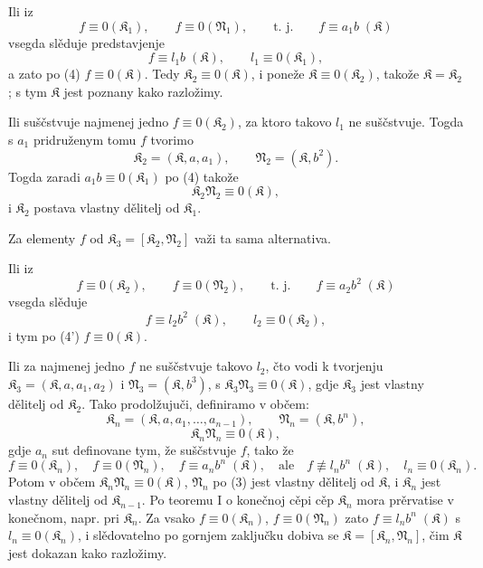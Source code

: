 \documentclass[11pt]{article}
\newcommand{\ideal}[1]{\mathfrak{#1}}
\begin{document}
Ili iz
\[
 f\equiv0(\ideal K_1),\qquad f\equiv0(\ideal N_1),
 \qquad\text{t. j.}\qquad f\equiv a_1 b\;(\ideal K)
\]
vsegda slěduje predstavjenje
\[
 f\equiv l_1 b\;(\ideal K),\qquad l_1\equiv0(\ideal K_1),
\]
a zato po (4) \(f\equiv0(\ideal K)\). Tedy \(\ideal K_2\equiv0(\ideal K)\), i poneže \(\ideal K\equiv0(\ideal K_2)\), takože \(\ideal K=\ideal K_2\); s tym \(\ideal K\) jest poznany kako razložimy.

Ili suščstvuje najmenej jedno \(f\equiv0(\ideal K_2)\), za ktoro takovo \(l_1\) ne suščstvuje. Togda s \(a_1\) pridruženym tomu \(f\) tvorimo
\[
 \ideal K_2=(\ideal K,a,a_1),\qquad \ideal N_2=(\ideal K,b^2).
\]
Togda zaradi \(a_1b\equiv0(\ideal K_1)\) po (4) takože
\begin{equation}
 \ideal K_2\ideal N_2\equiv0(\ideal K),
\tag{4'}
\end{equation}
i \(\ideal K_2\) postava vlastny dělitelj od \(\ideal K_1\).

Za elementy \(f\) od \(\ideal K_3=[\ideal K_2,\ideal N_2]\) važi ta sama alternativa.

Ili iz
\[
 f\equiv0(\ideal K_2),\qquad f\equiv0(\ideal N_2),
 \qquad\text{t. j.}\qquad f\equiv a_2b^2\;(\ideal K)
\]
vsegda slěduje
\[
 f\equiv l_2b^2\;(\ideal K),\qquad l_2\equiv0(\ideal K_2),
\]
i tym po (4') \(f\equiv0(\ideal K)\).

Ili za najmenej jedno \(f\) ne suščstvuje takovo \(l_2\), čto vodi k tvorjenju \(\ideal K_3=(\ideal K,a,a_1,a_2)\) i \(\ideal N_3=(\ideal K,b^3)\), s \(\ideal K_3\ideal N_3\equiv0(\ideal K)\), gdje \(\ideal K_3\) jest vlastny dělitelj od \(\ideal K_2\). Tako prodolžujuči, definiramo v občem:
\[
 \ideal K_n=(\ideal K,a,a_1,\ldots,a_{n-1}),\qquad
 \ideal N_n=(\ideal K,b^n),
\]
\[
 \ideal K_n\ideal N_n\equiv0(\ideal K),
\]
gdje \(a_n\) sut definovane tym, že suščstvuje \(f\), tako že
\[
 f\equiv0(\ideal K_n),\quad f\equiv0(\ideal N_n),\quad
 f\equiv a_n b^n\;(\ideal K),\quad\text{ale}\quad
 f\not\equiv l_n b^n\;(\ideal K),\quad l_n\equiv0(\ideal K_n).
\]
Potom v občem \(\ideal K_n\ideal N_n\equiv0(\ideal K)\), \(\ideal N_n\) po (3) jest vlastny dělitelj od \(\ideal K\), i \(\ideal K_n\) jest vlastny dělitelj od \(\ideal K_{n-1}\). Po teoremu I o konečnoj cěpi cěp \(\ideal K_n\) mora prěrvatise v konečnom, napr. pri \(\ideal K_n\). Za vsako \(f\equiv0(\ideal K_n)\), \(f\equiv0(\ideal N_n)\) zato \(f\equiv l_n b^n\;(\ideal K)\) s \(l_n\equiv0(\ideal K_n)\), i slědovatelno po gornjem zaključku dobiva se \(\ideal K=[\ideal K_n,\ideal N_n]\), čim \(\ideal K\) jest dokazan kako razložimy.
\end{document}
